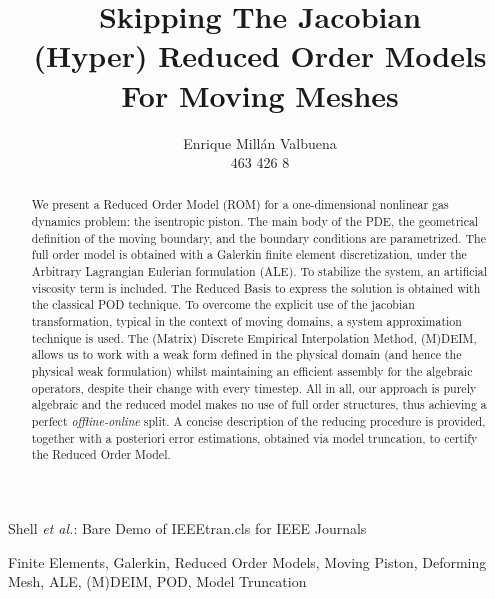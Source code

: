 \documentclass[a4paper, technote,compsoc]{IEEEtran}
\begin{document}
\onecolumn

\title{Skipping The Jacobian \\[5mm] \large{(Hyper) Reduced Order Models For Moving Meshes}}

\author{Enrique Millán Valbuena \\ \normalsize{463 426 8}}%
        
{Shell \MakeLowercase{\textit{et al.}}: Bare Demo of IEEEtran.cls for IEEE Journals}

\maketitle

\begin{abstract}
   We present a Reduced Order Model (ROM) for a one-dimensional nonlinear gas dynamics problem:
   the isentropic piston.
   The main body of the PDE, 
   the geometrical definition of the moving boundary, 
   and the boundary conditions are parametrized.
   The full order model is obtained with a Galerkin finite element discretization,
   under the Arbitrary Lagrangian Eulerian formulation (ALE).
   To stabilize the system, an artificial viscosity term is included.
   The Reduced Basis to express the solution is obtained with the classical POD technique.
   To overcome the explicit use of the jacobian transformation, 
   typical in the context of moving domains,
   a system approximation technique is used.
   The (Matrix) Discrete Empirical Interpolation Method, (M)DEIM, allows us
   to work with a weak form defined in the physical domain (and hence the physical weak formulation)
   whilst maintaining an
   efficient assembly for the algebraic operators, 
   despite their change with every timestep.
   All in all, our approach is purely algebraic
   and the reduced model makes no use of full order structures, 
   thus achieving a perfect \textit{offline-online} split.
   A concise description of the reducing procedure is provided, 
   together with a posteriori error estimations, obtained via model truncation,
   to certify the Reduced Order Model.
\end{abstract}

\begin{IEEEkeywords}
    \centering
    Finite Elements, Galerkin, Reduced Order Models, 
    Moving Piston, Deforming Mesh, ALE, 
    (M)DEIM, POD, 
    Model Truncation
\end{IEEEkeywords}
\end{document}
